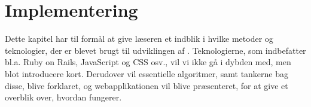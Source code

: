 \chapter{Implementering}
\label{chap:implementering}

Dette kapitel har til formål at give læseren et indblik i hvilke metoder og teknologier, der er blevet brugt til udviklingen af \Foodl. Teknologierne, som indbefatter bl.a. Ruby on Rails, JavaScript og CSS osv., vil vi ikke gå i dybden med, men blot introducere kort. Derudover vil essentielle algoritmer, samt tankerne bag disse, blive forklaret, og webapplikationen vil blive præsenteret, for at give et overblik over, hvordan {\Foodl} fungerer. 





